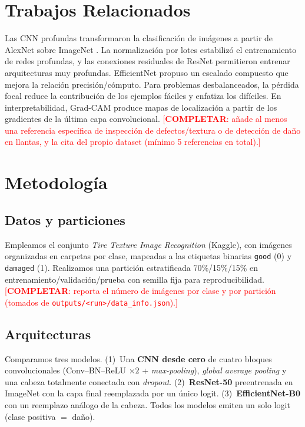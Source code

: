\documentclass{article}
\newcommand{\TODO}[1]{\textcolor{red}{[\textbf{COMPLETAR}: #1]}}
\begin{document}
\section{Trabajos Relacionados}
Las CNN profundas transformaron la clasificación de imágenes a partir de AlexNet
\cite{krizhevsky2012alexnet} sobre ImageNet \cite{deng2009imagenet}. La normalización
por lotes \cite{ioffe2015batchnorm} estabilizó el entrenamiento de redes profundas, y
las conexiones residuales de ResNet \cite{he2016resnet} permitieron entrenar
arquitecturas muy profundas. EfficientNet \cite{tan2019efficientnet} propuso un escalado
compuesto que mejora la relación precisión/cómputo. Para problemas desbalanceados, la
pérdida focal \cite{lin2017focal} reduce la contribución de los ejemplos fáciles y
enfatiza los difíciles. En interpretabilidad, Grad-CAM \cite{selvaraju2017gradcam}
produce mapas de localización a partir de los gradientes de la última capa
convolucional. \TODO{añade al menos una referencia específica de inspección de
defectos/textura o de detección de daño en llantas, y la cita del propio dataset
(mínimo 5 referencias en total).}

\section{Metodología}
\subsection{Datos y particiones}
Empleamos el conjunto \emph{Tire Texture Image Recognition} (Kaggle), con imágenes
organizadas en carpetas por clase, mapeadas a las etiquetas binarias
\texttt{good} (0) y \texttt{damaged} (1). Realizamos una partición estratificada
70\%/15\%/15\% en entrenamiento/validación/prueba con semilla fija para
reproducibilidad. \TODO{reporta el número de imágenes por clase y por partición
(tomados de \texttt{outputs/<run>/data\_info.json}).}

\subsection{Arquitecturas}
Comparamos tres modelos. (1)~Una \textbf{CNN desde cero} de cuatro bloques
convolucionales (Conv--BN--ReLU $\times 2$ + \emph{max-pooling}), \emph{global average
pooling} y una cabeza totalmente conectada con \emph{dropout}. (2)~\textbf{ResNet-50}
\cite{he2016resnet} preentrenada en ImageNet con la capa final reemplazada por un único
logit. (3)~\textbf{EfficientNet-B0} \cite{tan2019efficientnet} con un reemplazo análogo
de la cabeza. Todos los modelos emiten un solo logit (clase positiva $=$ daño).
\end{document}
